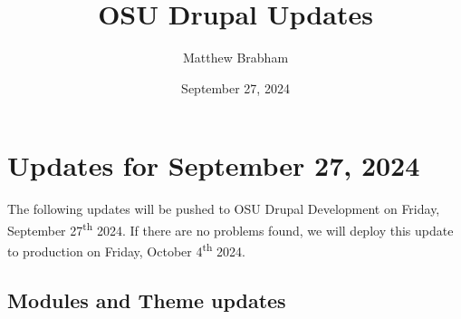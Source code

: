 
\title{OSU Drupal Updates}
\author{Matthew Brabham}
\date{September 27, 2024}

    \maketitle
    \tableofcontents


    \section{Updates for September 27, 2024}
    The following updates will be pushed to OSU Drupal Development on Friday, September 27\textsuperscript{th} 2024.
    If there are no problems found, we will deploy this update to production on Friday, October 4\textsuperscript{th} 2024.

    \subsection{Modules and Theme updates}

